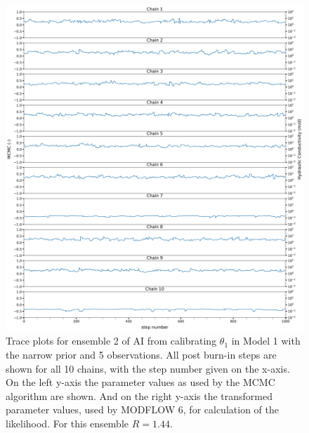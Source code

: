 \begin{figure}[ht]
\centering
\includegraphics[width=1.0\textwidth]{Figures/appendix_figs/trace_plots_ensemble2_Stretch priornarrow.png}
\caption{Trace plots for ensemble 2 of AI from calibrating  $\theta_1$ in Model 1 with the narrow prior and 5 observations. All post burn-in steps are shown for all 10 chains, with the step number given on the x-axis. On the left y-axis the parameter values as used by the MCMC algorithm are shown. And on the right y-axis the transformed parameter values, used by MODFLOW 6, for calculation of the likelihood. For this ensemble $\hat{R}=1.44$.}\label{traceplot_AI_priornarrow}
\end{figure}

\FloatBarrier
